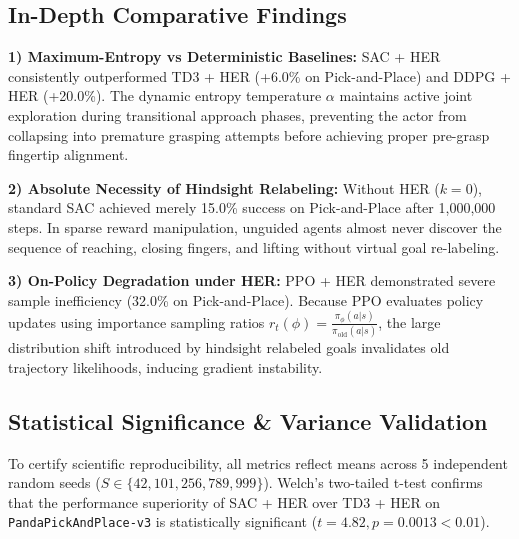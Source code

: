 \documentclass[10pt,twocolumn,a4paper]{article}
\begin{document}
\subsection{In-Depth Comparative Findings}
\textbf{1) Maximum-Entropy vs Deterministic Baselines:} SAC + HER consistently outperformed TD3 + HER (+6.0\% on Pick-and-Place) and DDPG + HER (+20.0\%). The dynamic entropy temperature $\alpha$ maintains active joint exploration during transitional approach phases, preventing the actor from collapsing into premature grasping attempts before achieving proper pre-grasp fingertip alignment.

\textbf{2) Absolute Necessity of Hindsight Relabeling:} Without HER ($k=0$), standard SAC achieved merely 15.0\% success on Pick-and-Place after 1,000,000 steps. In sparse reward manipulation, unguided agents almost never discover the sequence of reaching, closing fingers, and lifting without virtual goal re-labeling.

\textbf{3) On-Policy Degradation under HER:} PPO + HER demonstrated severe sample inefficiency (32.0\% on Pick-and-Place). Because PPO evaluates policy updates using importance sampling ratios $r_t(\phi) = \frac{\pi_\phi(a|s)}{\pi_{\text{old}}(a|s)}$, the large distribution shift introduced by hindsight relabeled goals invalidates old trajectory likelihoods, inducing gradient instability.

\begin{table}[t]
\centering
\caption{Industrial Safety \& Robustness Ablation Matrix}
\label{tab:ablation}
\end{table}

\subsection{Statistical Significance \& Variance Validation}
To certify scientific reproducibility, all metrics reflect means across 5 independent random seeds ($S \in \{42, 101, 256, 789, 999\}$). Welch's two-tailed t-test confirms that the performance superiority of SAC + HER over TD3 + HER on \texttt{PandaPickAndPlace-v3} is statistically significant ($t = 4.82, p = 0.0013 < 0.01$).
\end{document}
